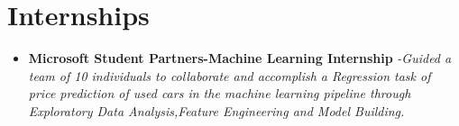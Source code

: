 \documentclass{article}
\begin{document}
    \section{Internships}
    \begin{itemize}
        \item{\textbf{\large{Microsoft Student Partners-Machine Learning Internship}}}
        \newline
        \textit{-Guided a team of 10 individuals to collaborate and accomplish a Regression task of price prediction of used cars in the machine learning pipeline through Exploratory Data Analysis,Feature Engineering and Model Building.}
    \end{itemize}
\end{document}
